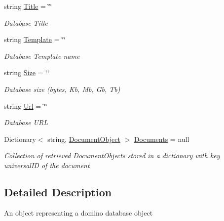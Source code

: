 \begin{DoxyCompactItemize}
string \mbox{\hyperlink{class_database_object_a9af3f75274dd39f7fa82a355dc4ddf39}{Title}} = \char`\"{}\char`\"{}
\begin{DoxyCompactList}\small\item\em Database Title \end{DoxyCompactList}\item 
string \mbox{\hyperlink{class_database_object_ac8ecdbe9722c00f787a62aef7d3dfa5a}{Template}} = \char`\"{}\char`\"{}
\begin{DoxyCompactList}\small\item\em Database Template name \end{DoxyCompactList}\item 
string \mbox{\hyperlink{class_database_object_ad86f5dd95a9debdef284e21e32936e9e}{Size}} = \char`\"{}\char`\"{}
\begin{DoxyCompactList}\small\item\em Database size (bytes, Kb, Mb, Gb, Tb) \end{DoxyCompactList}\item 
string \mbox{\hyperlink{class_database_object_a12da011e3dc03d3a10ac86df10c84f48}{Url}} = \char`\"{}\char`\"{}
\begin{DoxyCompactList}\small\item\em Database U\+RL \end{DoxyCompactList}\item 
Dictionary$<$ string, \mbox{\hyperlink{class_document_object}{Document\+Object}} $>$ \mbox{\hyperlink{class_database_object_afaf1159aa427c5bcce01c4b8c6f34514}{Documents}} = null
\begin{DoxyCompactList}\small\item\em Collection of retrieved Document\+Objects stored in a dictionary with key universal\+ID of the document \end{DoxyCompactList}\end{DoxyCompactItemize}


\subsection{Detailed Description}
An object representing a domino database object 

